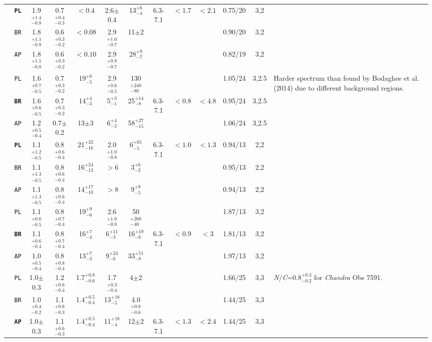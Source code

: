 \documentclass[iop,revtex4]{emulateapj}
\newcommand\M{\rule{0pt}{2.3ex}}
\newcommand\U{\rule{0pt}{3.2ex}}       %
\newcommand\D{\rule[-2.4ex]{0pt}{0pt}} %
\begin{document}
\begin{landscape}
\begin{longtable}{cp{0.6in}ccccccccccp{1.7in}}
\U\multirow{3}{*}{15}&\textbf{\texttt{PL}}&1.9$^{+1.4}_{-0.8}$&0.7$^{+0.4}_{-0.3}$&$<0.4$&2.6$\pm$0.4&13$^{+6}_{-4}$&6.3-7.1& $<1.7$&$<2.1$&0.75/20&3,2&\\
\M&\texttt{BR}&1.8$^{+1.1}_{-0.8}$&0.6$^{+0.3}_{-0.2}$&$<0.08$&2.9$^{+1.0}_{-0.7}$&11$\pm$2&&&&0.90/20&3,2&\\
\M\D&\texttt{AP}&1.8$^{+1.1}_{-0.8}$&0.6$^{+0.3}_{-0.2}$&$<0.10$&2.9$^{+0.8}_{-0.7}$&28$^{+9}_{-7}$&&&&0.82/19&3,2&\\
\cline{13-13}\\

\U\multirow{3}{*}{16}&\texttt{PL}&1.6$^{+0.7}_{-0.5}$&0.7$^{+0.3}_{-0.2}$&19$^{+6}_{-5}$&2.9$^{+0.6}_{-0.5}$&130$^{+240}_{-80}$&&&&1.05/24&3,2.5&\multirow{3}{1.7in}{Harder spectrum than found by Bodaghee et al. (2014) due to different background regions.}\\
\M&\textbf{\texttt{BR}}&1.6$^{+0.6}_{-0.5}$&0.7$^{+0.3}_{-0.2}$&14$^{+4}_{-3}$&5$^{+3}_{-1}$&25$^{+14}_{-8}$&6.3-7.1 &$<0.8$&$<4.8$&0.95/24&3,2.5&\\
\M\D&\texttt{AP}&1.2$^{+0.5}_{-0.4}$&0.7$\pm$0.2&13$\pm$3&6$^{+4}_{-2}$&58$^{+27}_{-15}$&&&&1.06/24&3,2.5&\\
\cline{13-13}

\U\multirow{3}{*}{17}&\textbf{\texttt{PL}}&1.1$^{+1.2}_{-0.5}$&0.8$^{+0.6}_{-0.4}$&21$^{+32}_{-16}$&2.0$^{+1.0}_{-0.8}$& 6$^{+65}_{-5}$&6.3-7.1&$<1.0$&$<1.3$&0.94/13&2,2&\\
\M&\texttt{BR}&1.1$^{+1.3}_{-0.5}$&0.8$^{+0.6}_{-0.4}$&16$^{+24}_{-12}$&$>6$&3$^{+6}_{-2}$&&&&0.95/13&2,2&\\
\M\D&\texttt{AP}&1.1$^{+1.3}_{-0.5}$&0.8$^{+0.6}_{-0.4}$&14$^{+17}_{-10}$&$>8$&9$^{+9}_{-5}$&&&&0.94/13&2,2&\\
\cline{13-13}

\U\multirow{3}{*}{18}&\texttt{PL}&1.1$^{+0.6}_{-0.5}$&0.8$^{+0.7}_{-0.4}$&19$^{+9}_{-6}$&2.6$^{+1.0}_{-0.8}$&50$^{+260}_{-40}$&&&&1.87/13&3,2&\\
\M&\textbf{\texttt{BR}}&1.1$^{+0.6}_{-0.4}$&0.8$^{+0.7}_{-0.4}$&16$^{+7}_{-4}$&6$^{+11}_{-3}$&16$^{+19}_{-6}$& 6.3-7.1&$<0.9$&$<3$&1.81/13&3,2&\\
\M\D&\texttt{AP}&1.0$^{+0.5}_{-0.4}$&0.8$^{+0.8}_{-0.4}$&13$^{+7}_{-3}$&9$^{+24}_{-6}$&33$^{+51}_{-8}$&&&&1.97/13&3,2&\\
\cline{13-13}

\U\multirow{3}{*}{19}&\texttt{PL}&1.0$\pm$0.3&1.2$^{+0.6}_{-0.4}$&1.7$^{+0.8}_{-0.6}$&1.7$^{+0.3}_{-0.4}$&4$\pm$2&&&& 1.66/25&3,3&\multirow{3}{1.7in}{\textit{N}/\textit{C}=0.8$^{+0.3}_{-0.2}$ for \textit{Chandra} Obs 7591.}\\ 
\M&\texttt{BR}&1.0$^{+0.4}_{-0.2}$&1.1$^{+0.6}_{-0.3}$&1.4$^{+0.5}_{-0.4}$&13$^{+18}_{-5}$&4.0$^{+0.8}_{-0.6}$& &&&1.44/25&3,3&\\
\M\D&\textbf{\texttt{AP}}&1.0$\pm$0.3&1.1$^{+0.6}_{-0.3}$&1.4$^{+0.5}_{-0.4}$&11$^{+18}_{-4}$&12$\pm$2&6.3-7.1&$<1.3$&$<2.4$& 1.44/25&3,3&\\
\cline{13-13}


\end{longtable}
\end{landscape}
\end{document}
